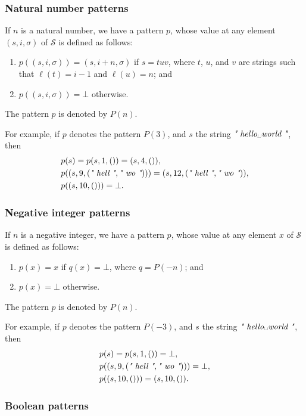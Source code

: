 \documentclass{article}
\begin{document}
\subsubsection{Natural number patterns}
\label{sec:amrbrlnv}

If \(n\) is a natural number, we have a pattern \(p\), whose value at
any element \((s, i, \sigma)\) of \(\mathcal{S}\) is defined as
follows:
\begin{enumerate}
\item \(p((s, i, \sigma)) = (s, i + n, \sigma)\) if \(s = tuv\), where
  \(t\), \(u\), and \(v\) are strings such that \(\ell(t) = i - 1\)
  and \(\ell(u) = n\); and
\item \(p((s, i, \sigma)) = \bot\) otherwise.
\end{enumerate}
The pattern \(p\) is denoted by \(P(n)\).

For example, if \(p\) denotes the pattern \(P(3)\), and \(s\) the
string \(\text{\itshape" \text{hello␣world} "}\), then
\begin{align*}
  &p(s) = p(s, 1, ()) = (s, 4, ()), \\
  &p((s, 9, (\text{\itshape" hell "}, \text{\itshape" wo "}))) =
    (s, 12, (\text{\itshape" hell "}, \text{\itshape" wo "})), \\
  &p((s, 10, ())) = \bot.
\end{align*}

\subsubsection{Negative integer patterns}
\label{sec:upt2mdy9}

If \(n\) is a negative integer, we have a pattern \(p\), whose value
at any element \(x\) of \(\mathcal{S}\) is defined as follows:
\begin{enumerate}
\item \(p(x) = x\) if \(q(x) = \bot\), where \(q = P(-n)\); and
\item \(p(x) = \bot\) otherwise.
\end{enumerate}
The pattern \(p\) is denoted by \(P(n)\).

For example, if \(p\) denotes the pattern \(P(-3)\), and \(s\) the
string \(\text{\itshape" \text{hello␣world} "}\), then
\begin{align*}
  &p(s) = p(s, 1, ()) = \bot, \\
  &p((s, 9, (\text{\itshape" hell "}, \text{\itshape" wo "}))) = \bot, \\
  &p((s, 10, ())) = (s, 10, ()).
\end{align*}

\subsubsection{Boolean patterns}
\label{sec:kuf3y73z}
\end{document}
